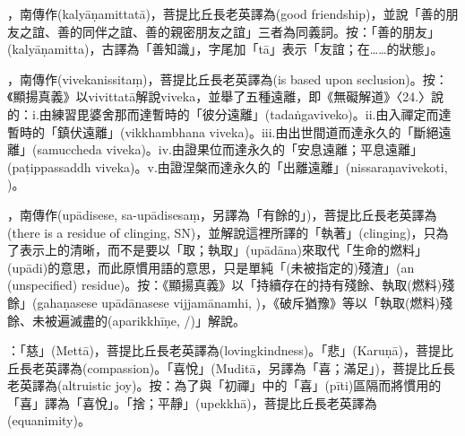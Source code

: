 \startitemgroup[noteitems]
\item{}，南傳作(kalyāṇamittatā)，菩提比丘長老英譯為(good friendship)，並說「善的朋友之誼、善的同伴之誼、善的親密朋友之誼」三者為同義詞。按：「善的朋友」(kalyāṇamitta)，古譯為「善知識」，字尾加「tā」表示「友誼；在……的狀態」。
\stopitemgroup

\startitemgroup[noteitems]
\item{}，南傳作(vivekanissitaṃ)，菩提比丘長老英譯為(is based upon seclusion)。按：《顯揚真義》以vivittatā解說viveka，並舉了五種遠離，即《無礙解道》〈24.〉說的：i.由練習毘婆舍那而達暫時的「彼分遠離」(tadaṅgaviveko)。ii.由入禪定而達暫時的「鎮伏遠離」(vikkhambhana viveka)。iii.由出世間道而達永久的「斷絕遠離」(samuccheda viveka)。iv.由證果位而達永久的「安息遠離；平息遠離」(paṭippassaddh viveka)。v.由證涅槃而達永久的「出離遠離」(nissaraṇavivekoti, )。
\stopitemgroup

\startitemgroup[noteitems]
\item{}，南傳作(upādisese, sa-upādisesaṃ，另譯為「有餘的」)，菩提比丘長老英譯為(there is a residue of clinging, SN)，並解說這裡所譯的「執著」(clinging)，只為了表示上的清晰，而不是要以「取；執取」(upādāna)來取代「生命的燃料」(upādi)的意思，而此原慣用語的意思，只是單純「(未被指定的)殘渣」(an (unspecified) residue)。按：《顯揚真義》以「持續存在的持有殘餘、執取(燃料)殘餘」(gahaṇasese upādānasese vijjamānamhi, )，《破斥猶豫》等以「執取(燃料)殘餘、未被遍滅盡的(aparikkhīṇe, /)」解說。
\stopitemgroup

\startitemgroup[noteitems]
\item{}：「慈」(Mettā)，菩提比丘長老英譯為(lovingkindness)。「悲」(Karuṇā)，菩提比丘長老英譯為(compassion)。「喜悅」(Muditā，另譯為「喜；滿足」)，菩提比丘長老英譯為(altruistic joy)。按：為了與「初禪」中的「喜」(pīti)區隔而將慣用的「喜」譯為「喜悅」。「捨；平靜」(upekkhā)，菩提比丘長老英譯為(equanimity)。
\stopitemgroup

